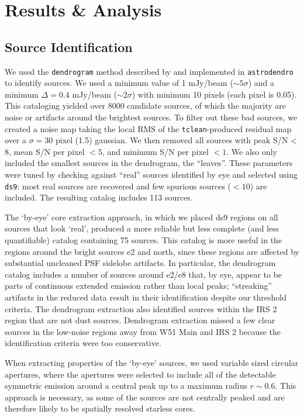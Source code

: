\documentclass{emulateapj}
\begin{document}
\section{Results \& Analysis}
\label{sec:results}
\subsection{Source Identification}
\label{sec:sourceid}
We used the \texttt{dendrogram} method described by \citet{Rosolowsky2008c} and
implemented in \texttt{astrodendro} to identify sources.  We used a minimum
value of 1 mJy/beam ($\sim5\sigma$) and a minimum $\Delta=0.4$ mJy/beam
($\sim2\sigma$) with minimum 10 pixels (each pixel is 0.05\arcsec).  This
cataloging yielded over 8000 candidate sources, of which the majority are noise
or artifacts around the brightest sources.  To filter out these bad sources,
we created a noise map taking the local RMS of the \texttt{tclean}-produced
residual map over a $\sigma=30$ pixel (1.5\arcsec) gaussian.  We then removed
all sources with peak S/N < 8, mean S/N per pixel $< 5$, and minimum S/N per
pixel $ < 1$.  We also only included the smallest sources in the dendrogram,
the ``leaves''.  These parameters were tuned by checking against ``real''
sources identified by eye and selected using \texttt{ds9}: most real sources are
recovered and few spurious sources ($<10$) are
included.  The resulting catalog includes 113 sources.

The `by-eye' core extraction approach, in which we placed ds9 regions on all
sources that look `real', produced a more reliable but less complete (and less
quantifiable) catalog containing 75 sources.  This catalog is more useful in
the regions around the bright sources e2 and north, since these regions are
affected by substantial uncleaned PSF sidelobe artifacts.  In particular, the
dendrogram catalog includes a number of sources around e2/e8 that, by eye,
appear to be parts of continuous extended emission rather than local peaks;
``streaking'' artifacts in the reduced data result in their identification
despite our threshold criteria.  The dendrogram extraction also identified
sources within the IRS 2 \hii region that are not dust sources.  Dendrogram
extraction missed a few clear sources in the low-noise regions away from
W51 Main and IRS 2 because the identification criteria were too conservative.

When extracting properties of the `by-eye' sources, we used variable sized
circular apertures, where the apertures were selected to include all of the
detectable symmetric emission around a central peak up to a maximum radius
$r\sim0.6$\arcsec.  This approach is necessary, as some of the sources are not
centrally peaked and are therefore likely to be spatially resolved starless
cores.
\end{document}
